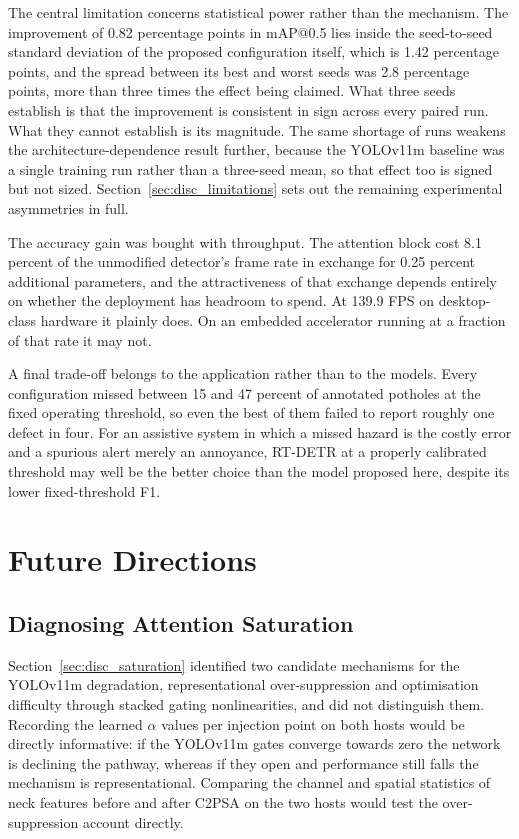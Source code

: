 \documentclass[MScCS]{uccthesis}
\begin{document}
The central limitation concerns statistical power rather than the mechanism. The
improvement of 0.82 percentage points in mAP@0.5 lies inside the seed-to-seed
standard deviation of the proposed configuration itself, which is 1.42 percentage
points, and the spread between its best and worst seeds was 2.8 percentage points,
more than three times the effect being claimed. What three seeds establish is that
the improvement is consistent in sign across every paired run. What they cannot
establish is its magnitude. The same shortage of runs weakens the
architecture-dependence result further, because the YOLOv11m baseline was a
single training run rather than a three-seed mean, so that effect too is signed
but not sized. Section~\ref{sec:disc_limitations} sets out the remaining
experimental asymmetries in full.

The accuracy gain was bought with throughput. The attention block cost 8.1 percent
of the unmodified detector's frame rate in exchange for 0.25 percent additional
parameters, and the attractiveness of that exchange depends entirely on whether the
deployment has headroom to spend. At 139.9 FPS on desktop-class hardware it plainly
does. On an embedded accelerator running at a fraction of that rate it may not.

A final trade-off belongs to the application rather than to the models. Every
configuration missed between 15 and 47 percent of annotated potholes at the fixed
operating threshold, so even the best of them failed to report roughly one defect in
four. For an assistive system in which a missed hazard is the costly error and a
spurious alert merely an annoyance, RT-DETR at a properly calibrated threshold may
well be the better choice than the model proposed here, despite its lower
fixed-threshold F1.

\section{Future Directions}
\label{sec:future_work}

\subsection{Diagnosing Attention Saturation}

Section~\ref{sec:disc_saturation} identified two candidate mechanisms for the
YOLOv11m degradation, representational over-suppression and optimisation
difficulty through stacked gating nonlinearities, and did not distinguish
them. Recording the learned $\alpha$ values per injection point on both hosts
would be directly informative: if the YOLOv11m gates converge towards zero the
network is declining the pathway, whereas if they open and performance still
falls the mechanism is representational. Comparing the channel and spatial
statistics of neck features before and after C2PSA on the two hosts would test
the over-suppression account directly.
\end{document}
